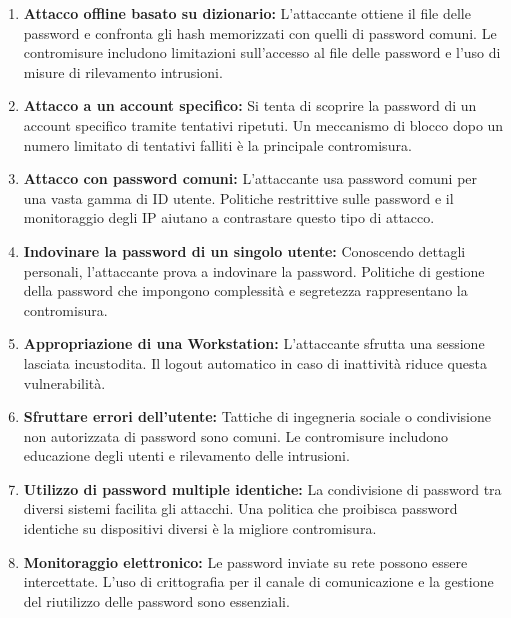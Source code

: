 \begin{enumerate}
    \item \textbf{Attacco offline basato su dizionario:} L'attaccante ottiene il file delle password e confronta gli hash memorizzati con quelli di password comuni. Le contromisure includono limitazioni sull'accesso al file delle password e l'uso di misure di rilevamento intrusioni.
    
    \item \textbf{Attacco a un account specifico:} Si tenta di scoprire la password di un account specifico tramite tentativi ripetuti. Un meccanismo di blocco dopo un numero limitato di tentativi falliti è la principale contromisura.
    
    \item \textbf{Attacco con password comuni:} L'attaccante usa password comuni per una vasta gamma di ID utente. Politiche restrittive sulle password e il monitoraggio degli IP aiutano a contrastare questo tipo di attacco.
    
    \item \textbf{Indovinare la password di un singolo utente:} Conoscendo dettagli personali, l'attaccante prova a indovinare la password. Politiche di gestione della password che impongono complessità e segretezza rappresentano la contromisura.
    
    \item \textbf{Appropriazione di una Workstation:} L'attaccante sfrutta una sessione lasciata incustodita. Il logout automatico in caso di inattività riduce questa vulnerabilità.
    
    \item \textbf{Sfruttare errori dell'utente:} Tattiche di ingegneria sociale o condivisione non autorizzata di password sono comuni. Le contromisure includono educazione degli utenti e rilevamento delle intrusioni.
    
    \item \textbf{Utilizzo di password multiple identiche:} La condivisione di password tra diversi sistemi facilita gli attacchi. Una politica che proibisca password identiche su dispositivi diversi è la migliore contromisura.
    
    \item \textbf{Monitoraggio elettronico:} Le password inviate su rete possono essere intercettate. L'uso di crittografia per il canale di comunicazione e la gestione del riutilizzo delle password sono essenziali.
\end{enumerate}

